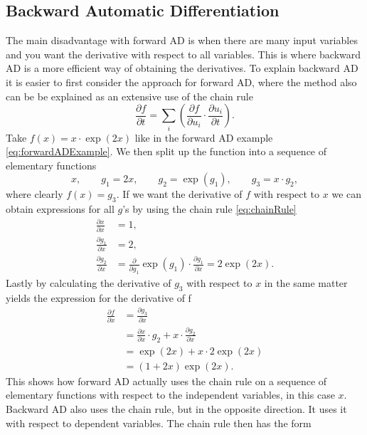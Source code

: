 \subsection{Backward Automatic Differentiation}
\label{sec:BackwardAD}
The main disadvantage with forward AD is when there are many input variables and you want the derivative with respect to all variables. This is where backward AD is a more efficient way of obtaining the derivatives. To explain backward AD it is easier to first consider the approach for forward AD, where the method also can be be explained as an extensive use of the chain rule
\begin{equation}
    \label{eq:chainRule}
    \frac{\partial f}{\partial t} = \sum_i\left(\frac{\partial f}{\partial u_i}\cdot\frac{\partial u_i}{\partial t}\right).
\end{equation}
Take $f(x) = x\cdot\exp(2x)$ like in the forward AD example \eqref{eq:forwardADExample}. We then split up the function into a sequence of elementary functions
\begin{equation}
    \label{eq:BackwardADSeperationSimple}
    x, \hspace{2em} g_1 = 2x, \hspace{2em} g_2 = \exp(g_1), \hspace{2em} g_3 = x\cdot g_2,
\end{equation}
where clearly $f(x) = g_3$. If we want the derivative of $f$ with respect to $x$ we can obtain expressions for all $g$'s by using the chain rule \eqref{eq:chainRule}
\begin{align*}
     \frac{\partial x}{\partial x} &= 1, \\
     \frac{\partial g_1}{\partial x} &= 2, \\
     \frac{\partial g_2}{\partial x} &= \frac{\partial}{\partial g_1}\exp(g_1)\cdot\frac{\partial g_1}{\partial x} = 2\exp(2x).
\end{align*}
Lastly by calculating the derivative of $g_3$ with respect to $x$ in the same matter yields the expression for the derivative of f
\begin{align*}
    \frac{\partial f}{\partial x} &= \frac{\partial g_3}{\partial x}\\
    &=\frac{\partial x}{\partial x}\cdot g_2 + x\cdot\frac{\partial g_2}{\partial x}\\
    &= \exp(2x) + x\cdot 2\exp(2x) \\
    &= (1+2x)\exp(2x).
\end{align*}
This shows how forward AD actually uses the chain rule on a sequence of elementary functions with respect to the independent variables, in this case $x$. Backward AD also uses the chain rule, but in the opposite direction. It uses it with respect to dependent variables. The chain rule then has the form

